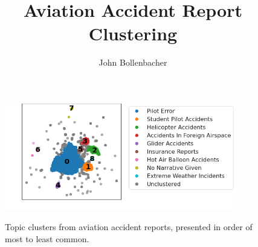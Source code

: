 \documentclass[a4paper,11pt]{article}
\title{\vspace{-1ex}Aviation Accident Report Clustering\vspace{-1ex}}
\author[]{John Bollenbacher
}
\affil{Observatory on Social Media\\
Indiana University, Indiana, USA
}
\date{}
\begin{document}
\maketitle
\thispagestyle{fancy}

\vspace{-8ex}

\begin{figure}[h!]
  \centering
  \includegraphics[width=0.9\textwidth]{cluster_plot.png}
  \label{fig:clusters}
  \vspace{-4ex}
  \caption{Topic clusters from aviation accident reports, presented in order of most to least common.}
\end{figure}
\end{document}

